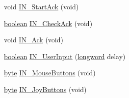 \begin{DoxyCompactItemize}
\item 
void \hyperlink{ID__IN_8C_ac666b84a87364ddab589ceb0daaa129a}{IN\_\-StartAck} (void)
\item 
\hyperlink{ID__HEAD_8H_a7c6368b321bd9acd0149b030bb8275ed}{boolean} \hyperlink{ID__IN_8C_a50a122900022f7051ec64d5c4613ebcf}{IN\_\-CheckAck} (void)
\item 
void \hyperlink{ID__IN_8C_af72058fb29d783ff37069492273ff6d7}{IN\_\-Ack} (void)
\item 
\hyperlink{ID__HEAD_8H_a7c6368b321bd9acd0149b030bb8275ed}{boolean} \hyperlink{ID__IN_8C_a9f2f68f5b727261b95762dcef168de14}{IN\_\-UserInput} (\hyperlink{ID__HEAD_8H_a8a9a7dd50c6fdb45dcdf0eb929479663}{longword} delay)
\item 
\hyperlink{ID__HEAD_8H_a0c8186d9b9b7880309c27230bbb5e69d}{byte} \hyperlink{ID__IN_8C_a1dc32dd9a62a416001a9954a70dc4563}{IN\_\-MouseButtons} (void)
\item 
\hyperlink{ID__HEAD_8H_a0c8186d9b9b7880309c27230bbb5e69d}{byte} \hyperlink{ID__IN_8C_abc6dd93d0e7777cd67e20f61361f353d}{IN\_\-JoyButtons} (void)
\end{DoxyCompactItemize}
